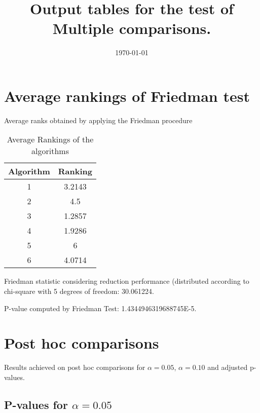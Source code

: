 \documentclass[a4paper,10pt]{article}
\title{Output tables for the test of Multiple comparisons.}
\author{}
\date{\today}
\begin{document}
\begin{landscape}
\pagestyle{empty}
\maketitle
\thispagestyle{empty}
\section{Average rankings of Friedman test}



Average ranks obtained by applying the Friedman procedure

\begin{table}[!htp]
\centering
\begin{tabular}{|c|c|}\hline
Algorithm&Ranking\\\hline
1 & 3.2143\\
2 & 4.5\\
3 & 1.2857\\
4 & 1.9286\\
5 & 6\\
6 & 4.0714\\
\hline
\end{tabular}
\caption{Average Rankings of the algorithms}
\end{table}

Friedman statistic considering reduction performance (distributed according to chi-square with 5 degrees of freedom: 30.061224.

P-value computed by Friedman Test: 1.4344946319688745E-5.\newline



\pagebreak

\section{Post hoc comparisons}

Results achieved on post hoc comparisons for $\alpha = 0.05$, $\alpha = 0.10$ and adjusted p-values.

\subsection{P-values for $\alpha=0.05$}


\end{landscape}
\end{document}
